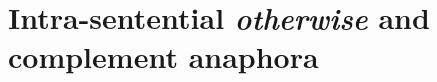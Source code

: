 %
%
%
%
%
%
%



\section{Intra-sentential \textit{otherwise} and complement anaphora}
\label{sec:bonus}
%
%

